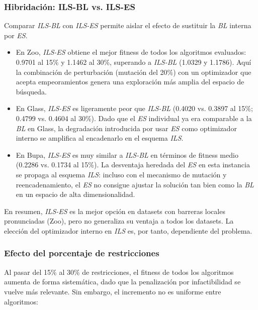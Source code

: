 \documentclass[12pt]{article}
\begin{document}
\subsubsection*{Hibridación: ILS-BL vs. ILS-ES}
 
Comparar \textit{ILS-BL} con \textit{ILS-ES} permite aislar el efecto de sustituir la \textit{BL} interna por \textit{ES}.
 
\begin{itemize}
    \item En {Zoo}, \textit{ILS-ES} obtiene el mejor fitness de todos los algoritmos
    evaluados: 0.9701 al 15\% y 1.1462 al 30\%, superando a \textit{ILS-BL} (1.0329 y
    1.1786). Aquí la combinación de perturbación (mutación del 20\%) con un
    optimizador que acepta empeoramientos genera una exploración más amplia del espacio
    de búsqueda.
 
    \item En {Glass}, \textit{ILS-ES} es ligeramente peor que \textit{ILS-BL} (0.4020 vs. 0.3897
    al 15\%; 0.4799 vs. 0.4604 al 30\%). Dado que el \textit{ES} individual ya era
    comparable a la \textit{BL} en Glass, la degradación introducida por usar \textit{ES} como optimizador
    interno se amplifica al encadenarlo en el esquema \textit{ILS}.
 
    \item En {Bupa}, \textit{ILS-ES} es muy similar a \textit{ILS-BL} en términos de fitness
    medio (0.2286 vs. 0.1734 al 15\%). La desventaja heredada del \textit{ES} en esta
    instancia se propaga al esquema \textit{ILS}: incluso con el mecanismo de mutación y
    reencadenamiento, el \textit{ES} no consigue ajustar la solución tan bien como la \textit{BL} en
    un espacio de alta dimensionalidad.
\end{itemize}
 
\noindent En resumen, \textit{ILS-ES} es la mejor opción en datasets con
barreras locales pronunciadas (Zoo), pero no generaliza su ventaja a todos los datasets.
La elección del optimizador interno en \textit{ILS} es, por tanto, dependiente del problema.
 
\subsubsection*{Efecto del porcentaje de restricciones}
 
Al pasar del 15\% al 30\% de restricciones, el fitness de todos los algoritmos
aumenta de forma sistemática, dado que la penalización por infactibilidad se vuelve más
relevante. Sin embargo, el incremento no es uniforme entre algoritmos:
 
\end{document}
